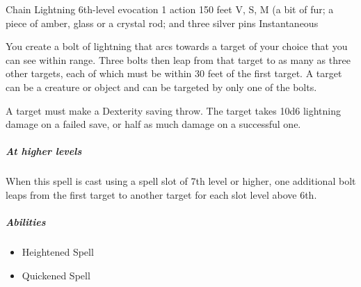 \documentclass[letterpaper,openany,oneside,twocolumn]{book}
\begin{document}
\DndSpellHeader
  {Chain Lightning}
  {6th-level evocation}
  {1 action}
  {150 feet}
  {V, S, M (a bit of fur; a piece of amber, glass or a crystal rod; and three silver pins}
  {Instantaneous}

You create a bolt of lightning that arcs towards a target of your choice that you can see within range. Three bolts then leap from that target to as many as three other targets, each of which must be within 30 feet of the first target. A target can be a creature or object and can be targeted by only one of the bolts.

A target must make a Dexterity saving throw. The target takes 10d6 lightning damage on a failed save, or half as much damage on a successful one.

\subparagraph*{At higher levels} When this spell is cast using a spell slot of 7th level or higher, one additional bolt leaps from the first target to another target for each slot level above 6th.

\subparagraph*{Abilities}
\begin{itemize}
  \item Heightened Spell
  \item Quickened Spell
\end{itemize}
\end{document}
